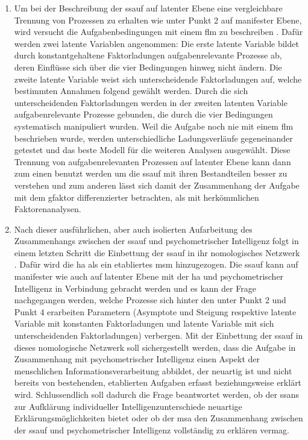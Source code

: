 \documentclass[11pt, twoside, a4paper]{book}		%
\begin{document}
\begin{enumerate}
	\item Um bei der Beschreibung der \gls{ssauf} auf latenter Ebene eine vergleichbare Trennung von Prozessen zu erhalten wie unter Punkt 2 auf manifester Ebene, wird versucht die Aufgabenbedingungen mit einem \gls{flm} zu beschreiben
	.
	Dafür werden zwei latente Variablen angenommen: Die erste latente Variable bildet durch konstantgehaltene Faktorladungen aufgabenrelevante Prozesse ab, deren Einflüsse sich über die vier Bedingungen hinweg nicht ändern. 
	Die zweite latente Variable weist sich unterscheidende Faktorladungen auf, welche  bestimmten Annahmen folgend gewählt werden.
	Durch die sich unterscheidenden Faktorladungen werden in der zweiten latenten Variable aufgabenrelevante Prozesse gebunden, die durch die vier Bedingungen systematisch manipuliert wurden. Weil die Aufgabe noch nie mit einem \gls{flm} beschrieben wurde, werden unterschiedliche Ladungsverläufe gegeneinander getestet und das beste Modell für die weiteren Analysen ausgewählt.
	Diese Trennung von aufgabenrelevanten Prozessen auf latenter Ebene kann dann zum einen benutzt werden um die \gls{ssauf} mit ihren Bestandteilen besser zu verstehen und zum anderen lässt sich damit der Zusammenhang  der Aufgabe mit dem \gls{gfaktor} differenzierter betrachten, als mit herkömmlichen Faktorenanalysen.

	\item Nach dieser ausführlichen, aber auch isolierten Aufarbeitung des Zusammenhangs zwischen der \gls{ssauf} und psychometrischer Intelligenz folgt in einem letzten Schritt die Einbettung der \gls{ssauf} in ihr nomologisches Netzwerk \citep{Cronbach1955} . Dafür wird die \gls{ha} als ein etabliertes \gls{msm} hinzugezogen. Die \gls{ssauf} kann auf manifester wie auch auf latenter Ebene mit der \gls{ha} und psychometrischer Intelligenz in Verbindung gebracht werden und es kann der Frage nachgegangen werden, welche Prozesse sich hinter den unter Punkt 2 und Punkt 4 erarbeiten Parametern (Asymptote und Steigung respektive latente Variable mit konstanten Faktorladungen und latente Variable mit sich unterscheidenden Faktorladungen) verbergen. Mit der Einbettung der \gls{ssauf} in dieses nomologische Netzwerk soll sichergestellt werden, dass die Aufgabe in Zusammenhang mit psychometrischer Intelligenz einen Aspekt der menschlichen Informationsverarbeitung abbildet, der neuartig ist und nicht bereits von bestehenden, etablierten Aufgaben erfasst beziehungsweise erklärt wird. Schlussendlich soll dadurch die Frage beantwortet werden, ob der \gls{ssans} zur Aufklärung individueller Intelligenzunterschiede neuartige Erklärungsmöglichkeiten bietet oder ob der \gls{msa} den Zusammenhang zwischen der \gls{ssauf} und psychometrischer Intelligenz vollständig zu erklären vermag.

\end{enumerate}
\end{document}
